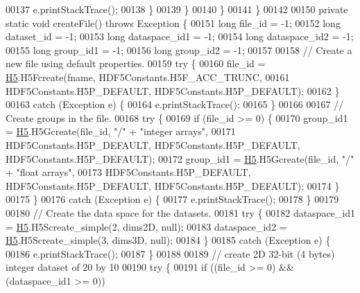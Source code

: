 \begin{DoxyCode}
00137                     e.printStackTrace();
00138                 \}
00139             \}
00140         \}
00141     \}
00142 
00150     \textcolor{keyword}{private} \textcolor{keyword}{static} \textcolor{keywordtype}{void} createFile() throws Exception \{
00151         \textcolor{keywordtype}{long} file\_id = -1;
00152         \textcolor{keywordtype}{long} dataset\_id = -1;
00153         \textcolor{keywordtype}{long} dataspace\_id1 = -1;
00154         \textcolor{keywordtype}{long} dataspace\_id2 = -1;
00155         \textcolor{keywordtype}{long} group\_id1 = -1;
00156         \textcolor{keywordtype}{long} group\_id2 = -1;
00157 
00158         \textcolor{comment}{// Create a new file using default properties.}
00159         \textcolor{keywordflow}{try} \{
00160             file\_id = \hyperlink{namespace_h5}{H5}.H5Fcreate(fname, HDF5Constants.H5F\_ACC\_TRUNC,
00161                     HDF5Constants.H5P\_DEFAULT, HDF5Constants.H5P\_DEFAULT);
00162         \}
00163         \textcolor{keywordflow}{catch} (Exception e) \{
00164             e.printStackTrace();
00165         \}
00166 
00167         \textcolor{comment}{// Create groups in the file.}
00168         \textcolor{keywordflow}{try} \{
00169             \textcolor{keywordflow}{if} (file\_id >= 0) \{
00170                 group\_id1 = \hyperlink{namespace_h5}{H5}.H5Gcreate(file\_id, \textcolor{stringliteral}{"/"} + \textcolor{stringliteral}{"integer arrays"},
00171                         HDF5Constants.H5P\_DEFAULT, HDF5Constants.H5P\_DEFAULT, HDF5Constants.H5P\_DEFAULT);
00172                 group\_id1 = \hyperlink{namespace_h5}{H5}.H5Gcreate(file\_id, \textcolor{stringliteral}{"/"} + \textcolor{stringliteral}{"float arrays"},
00173                         HDF5Constants.H5P\_DEFAULT, HDF5Constants.H5P\_DEFAULT, HDF5Constants.H5P\_DEFAULT);
00174             \}
00175         \}
00176         \textcolor{keywordflow}{catch} (Exception e) \{
00177             e.printStackTrace();
00178         \}
00179 
00180         \textcolor{comment}{// Create the data space for the datasets.}
00181         \textcolor{keywordflow}{try} \{
00182             dataspace\_id1 = \hyperlink{namespace_h5}{H5}.H5Screate\_simple(2, dims2D, null);
00183             dataspace\_id2 = \hyperlink{namespace_h5}{H5}.H5Screate\_simple(3, dims3D, null);
00184         \}
00185         \textcolor{keywordflow}{catch} (Exception e) \{
00186             e.printStackTrace();
00187         \}
00188 
00189         \textcolor{comment}{// create 2D 32-bit (4 bytes) integer dataset of 20 by 10}
00190         \textcolor{keywordflow}{try} \{
00191             \textcolor{keywordflow}{if} ((file\_id >= 0) && (dataspace\_id1 >= 0))

\end{DoxyCode}
